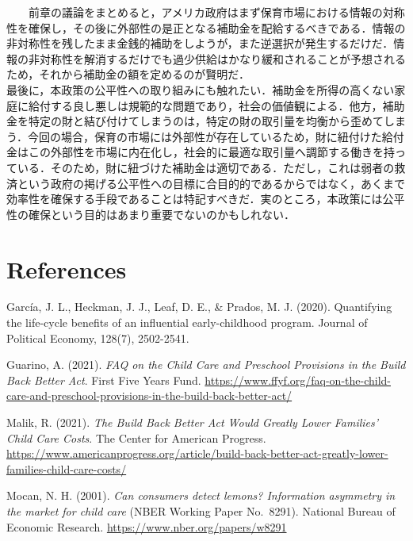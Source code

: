 \documentclass[
]{ltjarticle}
\begin{document}
~~~~前章の議論をまとめると，アメリカ政府はまず保育市場における情報の対称性を確保し，その後に外部性の是正となる補助金を配給するべきである．情報の非対称性を残したまま金銭的補助をしようが，また逆選択が発生するだけだ．情報の非対称性を解消するだけでも過少供給はかなり緩和されることが予想されるため，それから補助金の額を定めるのが賢明だ．\\
\hspace*{0.333em}\hspace*{0.333em}\hspace*{0.333em}\hspace*{0.333em}最後に，本政策の公平性への取り組みにも触れたい．補助金を所得の高くない家庭に給付する良し悪しは規範的な問題であり，社会の価値観による．他方，補助金を特定の財と結び付けてしまうのは，特定の財の取引量を均衡から歪めてしまう．今回の場合，保育の市場には外部性が存在しているため，財に紐付けた給付金はこの外部性を市場に内在化し，社会的に最適な取引量へ調節する働きを持っている．そのため，財に紐づけた補助金は適切である．ただし，これは弱者の救済という政府の掲げる公平性への目標に合目的的であるからではなく，あくまで効率性を確保する手段であることは特記すべきだ．実のところ，本政策には公平性の確保という目的はあまり重要でないのかもしれない．

\hypertarget{references}{%
\section{References}\label{references}}

\setlength{\parindent}{-0.2in}
\setlength{\leftskip}{0.2in}
\setlength{\parskip}{8pt}

\noindent

García, J. L., Heckman, J. J., Leaf, D. E., \& Prados, M. J. (2020).
Quantifying the life-cycle benefits of an influential early-childhood
program. Journal of Political Economy, 128(7), 2502-2541.

Guarino, A. (2021). \emph{FAQ on the Child Care and Preschool Provisions
in the Build Back Better Act}. First Five Years Fund.
\url{https://www.ffyf.org/faq-on-the-child-care-and-preschool-provisions-in-the-build-back-better-act/}

Malik, R. (2021). \emph{The Build Back Better Act Would Greatly Lower
Families' Child Care Costs}. The Center for American Progress.
\url{https://www.americanprogress.org/article/build-back-better-act-greatly-lower-families-child-care-costs/}

Mocan, N. H. (2001). \emph{Can consumers detect lemons? Information
asymmetry in the market for child care} (NBER Working Paper No.~8291).
National Bureau of Economic Research.
\url{https://www.nber.org/papers/w8291}
\end{document}
